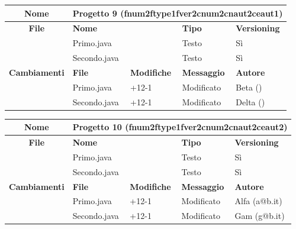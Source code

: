 \begin{table}[ht]
\footnotesize
\begin{tabular}{|c|p{2.5cm}|p{2cm}|p{2.5cm}|p{2.5cm}|}
  \hline
  \textbf{Nome}	& \multicolumn{4}{l|}{Progetto 9 (fnum2ftype1fver2cnum2cnaut2ceaut1)} 									\\
  \hline
  \rowcolor{lightgray}\textbf{File} 		& \multicolumn{2}{l|}{\textbf{Nome}}		& \textbf{Tipo}		& \textbf{Versioning} 		\\
						\cline{2-5}
						& \multicolumn{2}{l|}{Primo.java}		& Testo			& Sì				\\
						\cline{2-5}
						& \multicolumn{2}{l|}{Secondo.java}		& Testo			& Sì				\\
  \hline
  \rowcolor{lightgray}\textbf{Cambiamenti}	& \textbf{File}		&\textbf{Modifiche}	& \textbf{Messaggio}	& \textbf{Autore}		\\
						\cline{2-5}
						& Primo.java		& +12-1	  		& Modificato		& Beta ()			\\
						\cline{2-5}
						& Secondo.java		& +12-1	  		& Modificato		& Delta ()			\\
  \hline
\end{tabular}
\end{table}
\clearpage
\begin{table}[ht]
\footnotesize
\begin{tabular}{|c|p{2.5cm}|p{2cm}|p{2.5cm}|p{2.5cm}|}
  \hline
  \textbf{Nome}	& \multicolumn{4}{l|}{Progetto 10 (fnum2ftype1fver2cnum2cnaut2ceaut2)} 									\\
  \hline
  \rowcolor{lightgray}\textbf{File} 		& \multicolumn{2}{l|}{\textbf{Nome}}		& \textbf{Tipo}		& \textbf{Versioning} 		\\
						\cline{2-5}
						& \multicolumn{2}{l|}{Primo.java}		& Testo			& Sì				\\
						\cline{2-5}
						& \multicolumn{2}{l|}{Secondo.java}		& Testo			& Sì				\\
  \hline
  \rowcolor{lightgray}\textbf{Cambiamenti}	& \textbf{File}		&\textbf{Modifiche}	& \textbf{Messaggio}	& \textbf{Autore}		\\
						\cline{2-5}
						& Primo.java		& +12-1	  		& Modificato		& Alfa (a@b.it)			\\
						\cline{2-5}
						& Secondo.java		& +12-1	  		& Modificato		& Gam (g@b.it)		\\
						
  \hline
\end{tabular}
\end{table}


